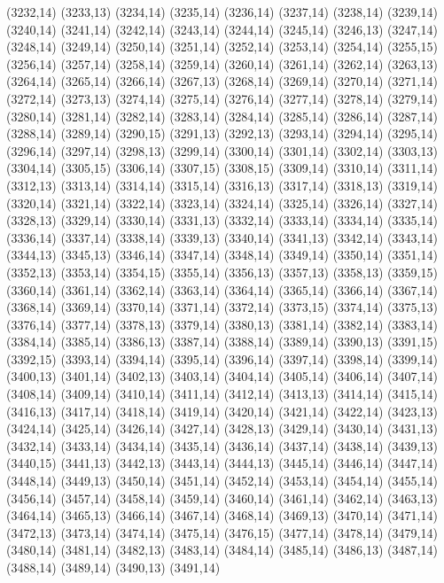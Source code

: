 (3232,14)
(3233,13)
(3234,14)
(3235,14)
(3236,14)
(3237,14)
(3238,14)
(3239,14)
(3240,14)
(3241,14)
(3242,14)
(3243,14)
(3244,14)
(3245,14)
(3246,13)
(3247,14)
(3248,14)
(3249,14)
(3250,14)
(3251,14)
(3252,14)
(3253,14)
(3254,14)
(3255,15)
(3256,14)
(3257,14)
(3258,14)
(3259,14)
(3260,14)
(3261,14)
(3262,14)
(3263,13)
(3264,14)
(3265,14)
(3266,14)
(3267,13)
(3268,14)
(3269,14)
(3270,14)
(3271,14)
(3272,14)
(3273,13)
(3274,14)
(3275,14)
(3276,14)
(3277,14)
(3278,14)
(3279,14)
(3280,14)
(3281,14)
(3282,14)
(3283,14)
(3284,14)
(3285,14)
(3286,14)
(3287,14)
(3288,14)
(3289,14)
(3290,15)
(3291,13)
(3292,13)
(3293,14)
(3294,14)
(3295,14)
(3296,14)
(3297,14)
(3298,13)
(3299,14)
(3300,14)
(3301,14)
(3302,14)
(3303,13)
(3304,14)
(3305,15)
(3306,14)
(3307,15)
(3308,15)
(3309,14)
(3310,14)
(3311,14)
(3312,13)
(3313,14)
(3314,14)
(3315,14)
(3316,13)
(3317,14)
(3318,13)
(3319,14)
(3320,14)
(3321,14)
(3322,14)
(3323,14)
(3324,14)
(3325,14)
(3326,14)
(3327,14)
(3328,13)
(3329,14)
(3330,14)
(3331,13)
(3332,14)
(3333,14)
(3334,14)
(3335,14)
(3336,14)
(3337,14)
(3338,14)
(3339,13)
(3340,14)
(3341,13)
(3342,14)
(3343,14)
(3344,13)
(3345,13)
(3346,14)
(3347,14)
(3348,14)
(3349,14)
(3350,14)
(3351,14)
(3352,13)
(3353,14)
(3354,15)
(3355,14)
(3356,13)
(3357,13)
(3358,13)
(3359,15)
(3360,14)
(3361,14)
(3362,14)
(3363,14)
(3364,14)
(3365,14)
(3366,14)
(3367,14)
(3368,14)
(3369,14)
(3370,14)
(3371,14)
(3372,14)
(3373,15)
(3374,14)
(3375,13)
(3376,14)
(3377,14)
(3378,13)
(3379,14)
(3380,13)
(3381,14)
(3382,14)
(3383,14)
(3384,14)
(3385,14)
(3386,13)
(3387,14)
(3388,14)
(3389,14)
(3390,13)
(3391,15)
(3392,15)
(3393,14)
(3394,14)
(3395,14)
(3396,14)
(3397,14)
(3398,14)
(3399,14)
(3400,13)
(3401,14)
(3402,13)
(3403,14)
(3404,14)
(3405,14)
(3406,14)
(3407,14)
(3408,14)
(3409,14)
(3410,14)
(3411,14)
(3412,14)
(3413,13)
(3414,14)
(3415,14)
(3416,13)
(3417,14)
(3418,14)
(3419,14)
(3420,14)
(3421,14)
(3422,14)
(3423,13)
(3424,14)
(3425,14)
(3426,14)
(3427,14)
(3428,13)
(3429,14)
(3430,14)
(3431,13)
(3432,14)
(3433,14)
(3434,14)
(3435,14)
(3436,14)
(3437,14)
(3438,14)
(3439,13)
(3440,15)
(3441,13)
(3442,13)
(3443,14)
(3444,13)
(3445,14)
(3446,14)
(3447,14)
(3448,14)
(3449,13)
(3450,14)
(3451,14)
(3452,14)
(3453,14)
(3454,14)
(3455,14)
(3456,14)
(3457,14)
(3458,14)
(3459,14)
(3460,14)
(3461,14)
(3462,14)
(3463,13)
(3464,14)
(3465,13)
(3466,14)
(3467,14)
(3468,14)
(3469,13)
(3470,14)
(3471,14)
(3472,13)
(3473,14)
(3474,14)
(3475,14)
(3476,15)
(3477,14)
(3478,14)
(3479,14)
(3480,14)
(3481,14)
(3482,13)
(3483,14)
(3484,14)
(3485,14)
(3486,13)
(3487,14)
(3488,14)
(3489,14)
(3490,13)
(3491,14)
